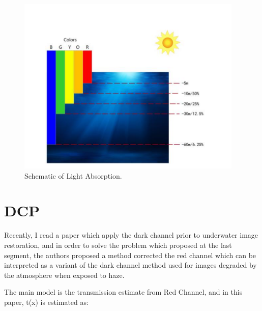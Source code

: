 \documentclass[10pt,twocolumn,letterpaper]{article}
\begin{document}
	\begin{figure}[htbp]
		\begin{center}
			\includegraphics[scale=0.2]{light.png}
		\end{center}
		\caption{Schematic of Light Absorption.}
		\label{light}
	\end{figure}
	
	\section{DCP}
	\par Recently, I read a paper which apply the dark channel prior to underwater image restoration, and in order to solve the problem which proposed at the last segment, the authors proposed a method corrected the red channel which can be interpreted as a variant of the dark channel method used for images degraded by the atmosphere when exposed to haze.
	\par The main model is the transmission estimate from Red Channel, and in this paper, t(x) is estimated as:
	
\end{document}
